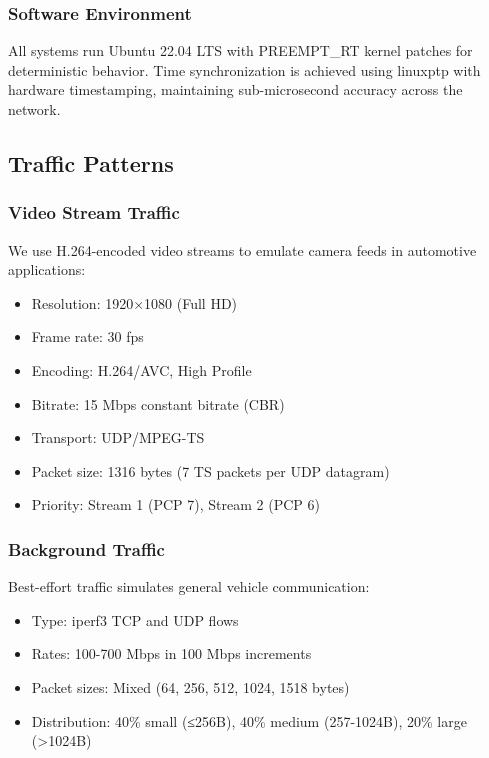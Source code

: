 \documentclass[10pt, journal, compsoc]{IEEEtran}
\begin{document}
\subsubsection{Software Environment}

All systems run Ubuntu 22.04 LTS with PREEMPT\_RT kernel patches for deterministic behavior. Time synchronization is achieved using linuxptp with hardware timestamping, maintaining sub-microsecond accuracy across the network.

\subsection{Traffic Patterns}

\subsubsection{Video Stream Traffic}

We use H.264-encoded video streams to emulate camera feeds in automotive applications:

\begin{itemize}
    \item Resolution: 1920×1080 (Full HD)
    \item Frame rate: 30 fps
    \item Encoding: H.264/AVC, High Profile
    \item Bitrate: 15 Mbps constant bitrate (CBR)
    \item Transport: UDP/MPEG-TS
    \item Packet size: 1316 bytes (7 TS packets per UDP datagram)
    \item Priority: Stream 1 (PCP 7), Stream 2 (PCP 6)
\end{itemize}

\subsubsection{Background Traffic}

Best-effort traffic simulates general vehicle communication:

\begin{itemize}
    \item Type: iperf3 TCP and UDP flows
    \item Rates: 100-700 Mbps in 100 Mbps increments
    \item Packet sizes: Mixed (64, 256, 512, 1024, 1518 bytes)
    \item Distribution: 40\% small (≤256B), 40\% medium (257-1024B), 20\% large (>1024B)
\end{itemize}
\end{document}
